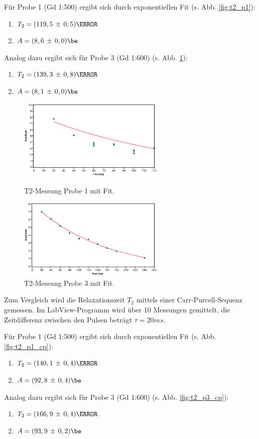 \documentclass[a4paper]{scrartcl} %
\newcommand{\err}[2]{( #1 \, \pm \, #2 )} %
\begin{document}
Für Probe 1 (Gd 1:500) ergibt sich durch exponentiellen Fit (s. Abb. \ref{fig:t2_p1}):
\begin{enumerate}
	\item[] $T_2 = \err{119,5}{0,5} \ms$
	\item[] $A = \err{8,6}{0,0} \be$
\end{enumerate}
Analog dazu ergibt sich für Probe 3 (Gd 1:600) (s. Abb. \ref{fig:t2_p3}):
\begin{enumerate}
	\item[] $T_2 = \err{139,3}{0,8} \ms$
	\item[] $A = \err{8,1}{0,0} \be$
\end{enumerate}
\begin{figure}[H]
	\centering
	\parbox{70mm}{
		\centering
		\includegraphics[width=70mm]{./Resources/t2_meas_p1.eps}
		\caption{T2-Messung Probe 1 mit Fit.}
		\label{fig:t2_p1}
	}
	\hspace*{\fill}
	\parbox{70mm}{
		\centering
		\includegraphics[width=70mm]{./Resources/t2_meas_p3.eps}
		\caption{T2-Messung Probe 3 mit Fit.}
		\label{fig:t2_p3}
	}
\end{figure}

Zum Vergleich wird die Relaxationszeit $T_2$ mittels einer Carr-Purcell-Sequenz gemessen. Im LabView-Programm wird über 10 Messungen gemittelt, die Zeitdifferenz zwischen den Pulsen beträgt $\tau = 20ms$.

Für Probe 1 (Gd 1:500) ergibt sich durch exponentiellen Fit (s. Abb. \ref{fig:t2_p1_cp}):
\begin{enumerate}
	\item[] $T_2 = \err{140,1}{0,4} \ms$
	\item[] $A = \err{92,8}{0,4} \be$
\end{enumerate}
Analog dazu ergibt sich für Probe 3 (Gd 1:600) (s. Abb. \ref{fig:t2_p3_cp}):
\begin{enumerate}
	\item[] $T_2 = \err{166,9}{0,4} \ms$
	\item[] $A = \err{93,9}{0,2} \be$
\end{enumerate}
\end{document}
